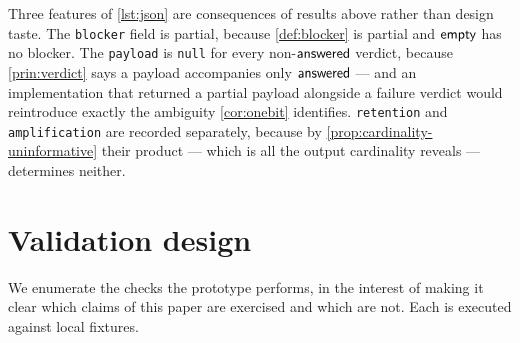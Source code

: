 Three features of \cref{lst:json} are consequences of results above rather than
design taste. The \texttt{blocker} field is partial, because
\cref{def:blocker} is partial and $\textsf{empty}$ has no blocker. The
\texttt{payload} is \texttt{null} for every non-$\textsf{answered}$ verdict, because
\cref{prin:verdict} says a payload accompanies only $\textsf{answered}$ --- and an
implementation that returned a partial payload alongside a failure verdict
would reintroduce exactly the ambiguity \cref{cor:onebit} identifies.
\texttt{retention} and \texttt{amplification} are recorded separately, because
by \cref{prop:cardinality-uninformative} their product --- which is all the
output cardinality reveals --- determines neither.

\section{Validation design}
\label{sec:validation}

We enumerate the checks the prototype performs, in the interest of making it
clear which claims of this paper are exercised and which are not. Each is
executed against local fixtures.

